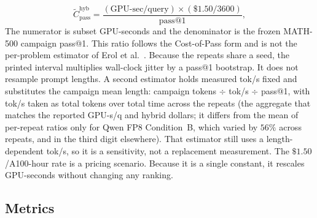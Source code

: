 \documentclass[11pt,a4paper]{article}
\begin{document}
\begin{equation}
\widetilde{C}_{\mathrm{pass}}^{\mathrm{hyb}} = \frac{(\text{GPU-sec/query})\times (\$1.50/3600)}{\mathrm{pass@1}},
\end{equation}
The numerator is subset GPU-seconds and the denominator is the frozen MATH-500 campaign pass@1. This ratio follows the Cost-of-Pass form and is not the per-problem estimator of Erol et al.~\cite{erol2025costofpass}. Because the repeats share a seed, the printed interval multiplies wall-clock jitter by a pass@1 bootstrap. It does not resample prompt lengths. A second estimator holds measured tok/s fixed and substitutes the campaign mean length: campaign tokens $\div$ tok/s $\div$ pass@1, with tok/s taken as total tokens over total time across the repeats (the aggregate that matches the reported GPU-s/q and hybrid dollars; it differs from the mean of per-repeat ratios only for Qwen FP8 Condition~B, which varied by $56\%$ across repeats, and in the third digit elsewhere). That estimator still uses a length-dependent tok/s, so it is a sensitivity, not a replacement measurement. The $\$1.50$/A100-hour rate is a pricing scenario. Because it is a single constant, it rescales GPU-seconds without changing any ranking.

\subsection{Metrics}
\label{sec:metrics}
\end{document}
